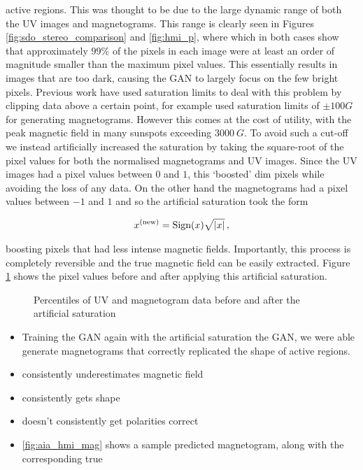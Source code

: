 \documentclass[11pt,a4paper,onecolumn]{report}
\begin{document}
\begin{itemize}
  active regions. This was thought to be due to the large dynamic range of both
  the UV images and magnetograms. This range is clearly seen in Figures
  \ref{fig:sdo_stereo_comparison} and \ref{fig:hmi_p}, where which in both cases
  show that approximately $99\%$ of the pixels in each image were at least an
  order of magnitude smaller than the maximum pixel values. This essentially
  results in images that are too dark, causing the GAN to largely focus on the
  few bright pixels. Previous work have used saturation limits to deal with this
  problem by clipping data above a certain point, \citet{Kim2019} for example
  used saturation limits of $\pm 100G$ for generating magnetograms. However this
  comes at the cost of utility, with the peak magnetic field in many sunspots
  exceeding $\SI[]{3000}[]{G}$. To avoid such a cut-off we instead artificially
  increased the saturation by taking the square-root of the pixel values for
  both the normalised magnetograms and UV images. Since the UV images had a
  pixel values between $0$ and $1$, this `boosted' dim pixels while
  avoiding the loss of any data. On the other hand the magnetograms had a
  pixel values between $-1$ and $1$ and so the artificial saturation took the form
  
\begin{align}
  x^{(\text{new})} = \text{Sign}(x)\sqrt{\absolutevalue{x}}\, ,
\end{align}

boosting pixels that had less intense magnetic fields. Importantly, this process
is completely reversible and the true magnetic field can be easily extracted.
Figure \ref{fig:artificial_sat} shows the pixel values before and after applying
this artificial saturation. 



\end{itemize}


\begin{figure}[h]
  \centering
  
  \caption{Percentiles of UV and magnetogram data before and after the artificial saturation}
  \label{fig:artificial_sat}
\end{figure}




\begin{itemize}
  \item Training the GAN again with the artificial saturation the GAN, we were able
  generate magnetograms that correctly replicated the shape of active regions.
  \item consistently underestimates magnetic field
  \item consistently gets shape
  \item doesn't consistently get polarities correct
  \item \ref{fig:aia_hmi_mag} shows a sample predicted magnetogram, along with
  the corresponding true 
\end{itemize}
\end{document}
